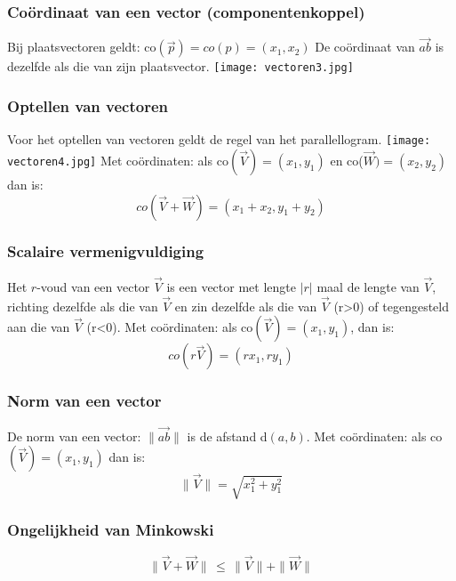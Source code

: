 \subsubsection{Co\"ordinaat van een vector (componentenkoppel)} \label{coordinaten}
\hypertarget{coordinaten}{}
Bij plaatsvectoren geldt: co$(\vec{p})=co(p)=(x_1, x_2)$\newline
De co\"ordinaat van $\vec{ab}$ is dezelfde als die van zijn plaatsvector.\newline
\texttt{[image: vectoren3.jpg]}

\subsubsection{Optellen van vectoren} \label{optellen_vectoren}
\hypertarget{optellen_vectoren}{}
Voor het optellen van vectoren geldt de regel van het parallellogram.\newline
\texttt{[image: vectoren4.jpg]}
Met co\"ordinaten: als co$(\vec{V})=(x_1, y_1)$ en co($\vec{W})=(x_2, y_2)$ dan is:
\[co(\vec{V}+\vec{W})=(x_1 +x_2, y_1+y_2)\]

\subsubsection{Scalaire vermenigvuldiging} \label{scalaire_vermenigv}
\hypertarget{scalaire_vermenigv}{}
Het $r$-voud van een vector $\vec{V}$ is een vector met lengte $|r|$ maal de lengte van $\vec{V}$, richting dezelfde als die van $\vec{V}$ en zin dezelfde als die van $\vec{V}$ (r>0) of tegengesteld aan die van $\vec{V}$ (r<0).\newline
Met co\"ordinaten: als co$(\vec{V})=(x_1, y_1)$, dan is:
\[co(r\vec{V})=(rx_1, ry_1)\]

\subsubsection{Norm van een vector} \label{norm_vector}
\hypertarget{norm_vector}{}
De norm van een vector: $\|\vec{ab}\|$ is de afstand d$(a, b)$.\newline
Met co\"ordinaten: als co$(\vec{V})=(x_1, y_1)$ dan is:
\[\|\vec{V}\| = \sqrt{x_1^2 + y_1^2}\]

\subsubsection{Ongelijkheid van Minkowski} \label{minkowski}
\hypertarget{minkowski}{}
\[\|\vec{V}+\vec{W}\|\, \leq\, \|\vec{V}\| + \|\vec{W}\|\]

